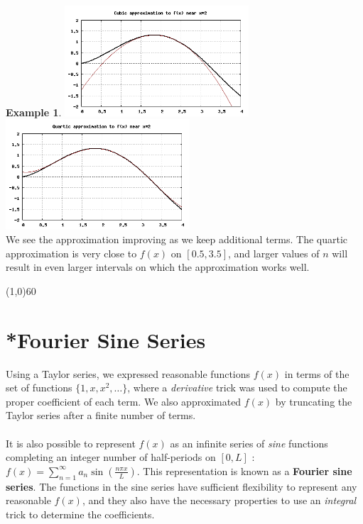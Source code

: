 \documentclass[10.5pt,twoside]{report}
\theoremstyle{definition}
\newtheorem{exmp}{Example}[section]
\begin{document}
\begin{exmp}
\includegraphics[width=2.7in]{example_6_4_6_3}
\includegraphics[width=2.7in]{example_6_4_6_4}
${}$\\

We see the approximation improving as we keep additional terms.  The quartic approximation is very close to $f(x)$ on $[0.5,3.5]$, and larger values of $n$ will result in even larger intervals on which the approximation works well.

\end{exmp}
\line(1,0){60}
\linethickness{0.5mm}

\pagebreak

\section{*Fourier Sine Series}\label{*Fourier Sine Series}

Using a Taylor series, we expressed reasonable functions $f(x)$ in terms of the set of functions $\lbrace 1,x,x^2,\dots\rbrace$, where a \textit{derivative} trick was used to compute the proper coefficient of each term.  We also approximated $f(x)$ by truncating the Taylor series after a finite number of terms.\\

${}$\\

It is also possible to represent $f(x)$ as an infinite series of \textit{sine} functions completing an integer number of half-periods on $[0,L]$ :  $f(x)= \sum_{n=1}^{\infty} a_n \sin{\left( \frac{n\pi x}{L} \right) }$.  This representation is known as a \textbf{Fourier sine series}.  The functions in the sine series have sufficient flexibility to represent any reasonable $f(x)$, and they also have the necessary properties to use an \textit{integral} trick to determine the coefficients. \\
\end{document}
